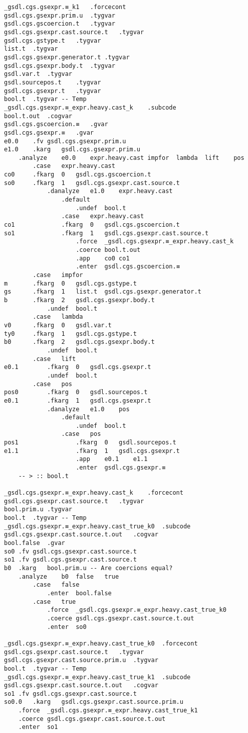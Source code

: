\documentclass{report}
\begin{document}
\begin{verbatim}
_gsdl.cgs.gsexpr.≡_k1	.forcecont
gsdl.cgs.gsexpr.prim.u	.tygvar
gsdl.cgs.gscoercion.t	.tygvar
gsdl.cgs.gsexpr.cast.source.t	.tygvar
gsdl.cgs.gstype.t	.tygvar
list.t	.tygvar
gsdl.cgs.gsexpr.generator.t	.tygvar
gsdl.cgs.gsexpr.body.t	.tygvar
gsdl.var.t	.tygvar
gsdl.sourcepos.t	.tygvar
gsdl.cgs.gsexpr.t	.tygvar
bool.t	.tygvar	-- Temp
_gsdl.cgs.gsexpr.≡_expr.heavy.cast_k	.subcode
bool.t.out	.cogvar
gsdl.cgs.gscoercion.≡	.gvar
gsdl.cgs.gsexpr.≡	.gvar
e0.0	.fv	gsdl.cgs.gsexpr.prim.u
e1.0	.karg	gsdl.cgs.gsexpr.prim.u
	.analyze	e0.0	expr.heavy.cast	impfor	lambda	lift	pos
		.case	expr.heavy.cast
co0		.fkarg	0	gsdl.cgs.gscoercion.t
so0		.fkarg	1	gsdl.cgs.gsexpr.cast.source.t
			.danalyze	e1.0	expr.heavy.cast
				.default
					.undef	bool.t
				.case	expr.heavy.cast
co1				.fkarg	0	gsdl.cgs.gscoercion.t
so1				.fkarg	1	gsdl.cgs.gsexpr.cast.source.t
					.force	_gsdl.cgs.gsexpr.≡_expr.heavy.cast_k
					.coerce	bool.t.out
					.app	co0	co1
					.enter	gsdl.cgs.gscoercion.≡
		.case	impfor
m		.fkarg	0	gsdl.cgs.gstype.t
gs		.fkarg	1	list.t	gsdl.cgs.gsexpr.generator.t
b		.fkarg	2	gsdl.cgs.gsexpr.body.t
			.undef	bool.t
		.case	lambda
v0		.fkarg	0	gsdl.var.t
ty0		.fkarg	1	gsdl.cgs.gstype.t
b0		.fkarg	2	gsdl.cgs.gsexpr.body.t
			.undef	bool.t
		.case	lift
e0.1		.fkarg	0	gsdl.cgs.gsexpr.t
			.undef	bool.t
		.case	pos
pos0		.fkarg	0	gsdl.sourcepos.t
e0.1		.fkarg	1	gsdl.cgs.gsexpr.t
			.danalyze	e1.0	pos
				.default
					.undef	bool.t
				.case	pos
pos1				.fkarg	0	gsdl.sourcepos.t
e1.1				.fkarg	1	gsdl.cgs.gsexpr.t
					.app	e0.1	e1.1
					.enter	gsdl.cgs.gsexpr.≡
	-- > :: bool.t

_gsdl.cgs.gsexpr.≡_expr.heavy.cast_k	.forcecont
gsdl.cgs.gsexpr.cast.source.t	.tygvar
bool.prim.u	.tygvar
bool.t	.tygvar	-- Temp
_gsdl.cgs.gsexpr.≡_expr.heavy.cast_true_k0	.subcode
gsdl.cgs.gsexpr.cast.source.t.out	.cogvar
bool.false	.gvar
so0	.fv	gsdl.cgs.gsexpr.cast.source.t
so1	.fv	gsdl.cgs.gsexpr.cast.source.t
b0	.karg	bool.prim.u	-- Are coercions equal?
	.analyze	b0	false	true
		.case	false
			.enter	bool.false
		.case	true
			.force	_gsdl.cgs.gsexpr.≡_expr.heavy.cast_true_k0
			.coerce	gsdl.cgs.gsexpr.cast.source.t.out
			.enter	so0

_gsdl.cgs.gsexpr.≡_expr.heavy.cast_true_k0	.forcecont
gsdl.cgs.gsexpr.cast.source.t	.tygvar
gsdl.cgs.gsexpr.cast.source.prim.u	.tygvar
bool.t	.tygvar	-- Temp
_gsdl.cgs.gsexpr.≡_expr.heavy.cast_true_k1	.subcode
gsdl.cgs.gsexpr.cast.source.t.out	.cogvar
so1	.fv	gsdl.cgs.gsexpr.cast.source.t
so0.0	.karg	gsdl.cgs.gsexpr.cast.source.prim.u
	.force	_gsdl.cgs.gsexpr.≡_expr.heavy.cast_true_k1
	.coerce	gsdl.cgs.gsexpr.cast.source.t.out
	.enter	so1


\end{verbatim}
\end{document}
